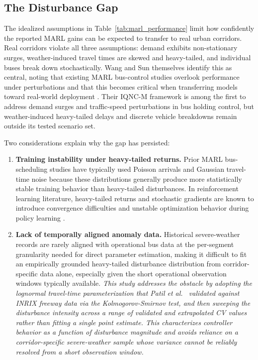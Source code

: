 \FloatBarrier

\subsection{The Disturbance Gap}
The idealized assumptions in Table~\ref{tab:marl_performance} limit how confidently the reported MARL gains can be expected to transfer to real urban corridors. Real corridors violate all three assumptions: demand exhibits non-stationary surges, weather-induced travel times are skewed and heavy-tailed, and individual buses break down stochastically. Wang and Sun themselves identify this as central, noting that existing MARL bus-control studies overlook performance under perturbations and that this becomes critical when transferring models toward real-world deployment \cite{Wangsun}. Their IQNC-M framework is among the first to address demand surges and traffic-speed perturbations in bus holding control, but weather-induced heavy-tailed delays and discrete vehicle breakdowns remain outside its tested scenario set.

Two considerations explain why the gap has persisted:

\begin{enumerate}
\item \textbf{Training instability under heavy-tailed returns.} Prior MARL bus-scheduling studies have typically used Poisson arrivals and Gaussian travel-time noise because these distributions generally produce more statistically stable training behavior than heavy-tailed disturbances. In reinforcement learning literature, heavy-tailed returns and stochastic gradients are known to introduce convergence difficulties and unstable optimization behavior during policy learning \cite{Henderson2018Matters,Agarwal2021Precipice}.

\item \textbf{Lack of temporally aligned anomaly data.} Historical severe-weather records are rarely aligned with operational bus data at the per-segment granularity needed for direct parameter estimation, making it difficult to fit an empirically grounded heavy-tailed disturbance distribution from corridor-specific data alone, especially given the short operational observation windows typically available. \textit{This study addresses the obstacle by adopting the lognormal travel-time parameterization that Patil et al.\ \cite{Patil2025Conformal} validated against INRIX freeway data via the Kolmogorov-Smirnov test, and then sweeping the disturbance intensity across a range of validated and extrapolated CV values rather than fitting a single point estimate. This characterizes controller behavior as a function of disturbance magnitude and avoids reliance on a corridor-specific severe-weather sample whose variance cannot be reliably resolved from a short observation window.}
\end{enumerate}

